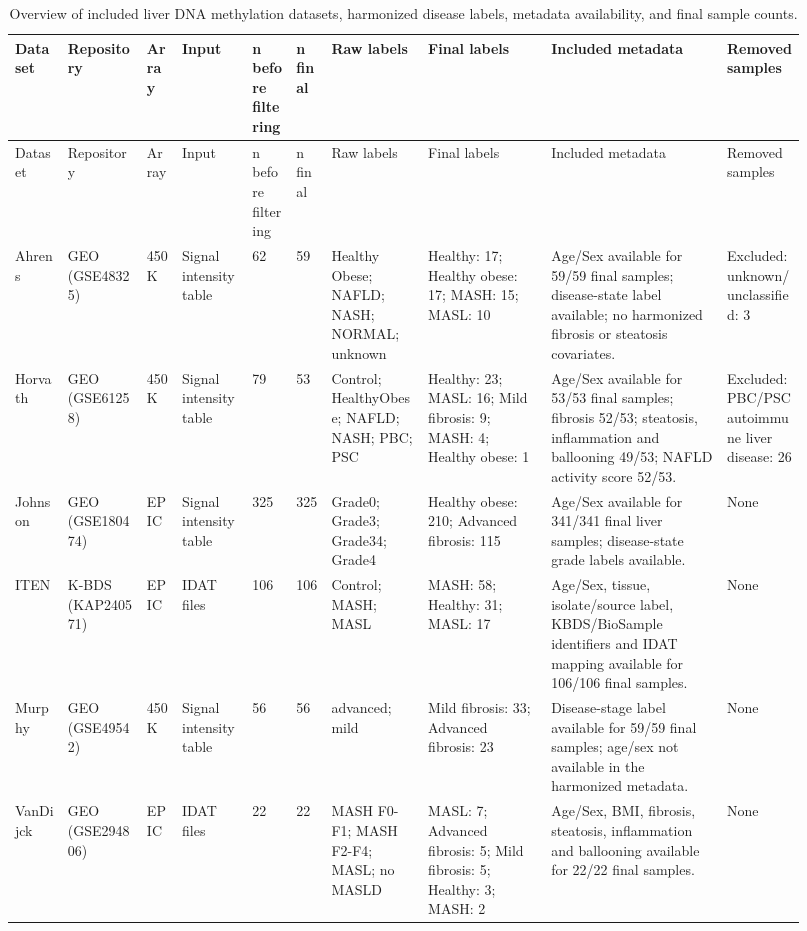 \begin{scriptsize}
\setlength{\tabcolsep}{2pt}
\begin{longtable}{@{}p{0.065\linewidth}p{0.090\linewidth}p{0.045\linewidth}p{0.085\linewidth}p{0.055\linewidth}p{0.045\linewidth}p{0.110\linewidth}p{0.140\linewidth}p{0.200\linewidth}p{0.090\linewidth}@{}}
\caption{Overview of included liver DNA methylation datasets, harmonized disease labels, metadata availability, and final sample counts.}\label{tab:data_overview}\\
\toprule
Dataset & Repository & Array & Input & n before filtering & n final & Raw labels & Final labels & Included metadata & Removed samples \\
\midrule
\endfirsthead
\toprule
Dataset & Repository & Array & Input & n before filtering & n final & Raw labels & Final labels & Included metadata & Removed samples \\
\midrule
\endhead
Ahrens & GEO (GSE48325) & 450K & Signal intensity table & 62 & 59 & Healthy Obese; NAFLD; NASH; NORMAL; unknown & Healthy: 17; Healthy obese: 17; MASH: 15; MASL: 10 & Age/Sex available for 59/59 final samples; disease-state label available; no harmonized fibrosis or steatosis covariates. & Excluded: unknown/unclassified: 3 \\
Horvath & GEO (GSE61258) & 450K & Signal intensity table & 79 & 53 & Control; HealthyObese; NAFLD; NASH; PBC; PSC & Healthy: 23; MASL: 16; Mild fibrosis: 9; MASH: 4; Healthy obese: 1 & Age/Sex available for 53/53 final samples; fibrosis 52/53; steatosis, inflammation and ballooning 49/53; NAFLD activity score 52/53. & Excluded: PBC/PSC autoimmune liver disease: 26 \\
Johnson & GEO (GSE180474) & EPIC & Signal intensity table & 325 & 325 & Grade0; Grade3; Grade34; Grade4 & Healthy obese: 210; Advanced fibrosis: 115 & Age/Sex available for 341/341 final liver samples; disease-state grade labels available. & None \\
ITEN & K-BDS (KAP240571) & EPIC & IDAT files & 106 & 106 & Control; MASH; MASL & MASH: 58; Healthy: 31; MASL: 17 & Age/Sex, tissue, isolate/source label, KBDS/BioSample identifiers and IDAT mapping available for 106/106 final samples. & None \\
Murphy & GEO (GSE49542) & 450K & Signal intensity table & 56 & 56 & advanced; mild & Mild fibrosis: 33; Advanced fibrosis: 23 & Disease-stage label available for 59/59 final samples; age/sex not available in the harmonized metadata. & None \\
VanDijck & GEO (GSE294806) & EPIC & IDAT files & 22 & 22 & MASH F0-F1; MASH F2-F4; MASL; no MASLD & MASL: 7; Advanced fibrosis: 5; Mild fibrosis: 5; Healthy: 3; MASH: 2 & Age/Sex, BMI, fibrosis, steatosis, inflammation and ballooning available for 22/22 final samples. & None \\
\bottomrule
\end{longtable}
\end{scriptsize}

